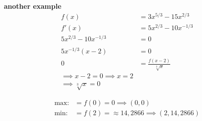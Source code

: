 \documentclass{report}
\begin{document}
\begin{multicols}{2}
\textbf{another example}\\
\begin{align*}
  f(x)&=3x^{5/3}-15x^{2/3}\\ 
  f'(x)&=5x^{2/3}-10x^{-1/3}\\
  5x^{2/3}-10x^{-1/3}&=0\\\\
  5x^{-1/3}(x-2)&=0\\
  0&=\frac{f(x-2)}{\sqrt[3]{x}}\\
  \implies x-2=0 \implies x=2\\
  \implies \sqrt[3]{x}=0
\end{align*}
\begin{center}
  
\end{center}
\begin{align*}
  \text{max:} &=f(0)=0 \implies (0,0)\\
  \text{min:} &=f(2)=\approx 14,2866 \implies (2,14,2866)\\
\end{align*}
\end{multicols}
\end{document}
